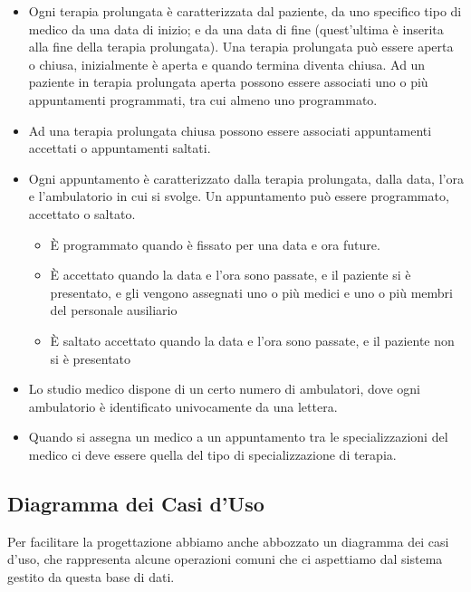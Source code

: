 \documentclass[11pt]{article}
\begin{document}
\begin{itemize}
    \item Ogni terapia prolungata è caratterizzata dal paziente, da uno specifico tipo di medico da una data di inizio; e da una data di fine (quest’ultima è inserita alla fine della terapia prolungata). Una terapia prolungata può essere aperta o chiusa, inizialmente è aperta e quando termina diventa chiusa. Ad un paziente in terapia prolungata aperta possono essere associati uno o più appuntamenti programmati, tra cui almeno uno programmato.
    \item Ad una terapia prolungata chiusa possono essere associati appuntamenti accettati o appuntamenti saltati.
    \item Ogni appuntamento è caratterizzato dalla terapia prolungata, dalla data, l’ora e l’ambulatorio in cui si svolge. Un appuntamento può essere programmato, accettato o saltato.
    \begin{itemize}
        \item È programmato quando è fissato per una data e ora future.
        \item È accettato quando la data e l’ora sono passate, e il paziente si è presentato, e gli vengono assegnati uno o più medici e uno o più membri del personale ausiliario
        \item È saltato accettato quando la data e l’ora sono passate, e il paziente non si è presentato
    \end{itemize} 
    \item Lo studio medico dispone di un certo numero di ambulatori, dove ogni ambulatorio è identificato univocamente da una lettera.
    \item Quando si assegna un medico a un appuntamento tra le specializzazioni del medico ci deve essere quella del tipo di specializzazione di terapia.

\end{itemize}

\subsection{Diagramma dei Casi d'Uso}

Per facilitare la progettazione abbiamo anche abbozzato un diagramma dei casi d'uso, che rappresenta alcune operazioni comuni che ci aspettiamo dal sistema gestito da questa base di dati.
\end{document}
